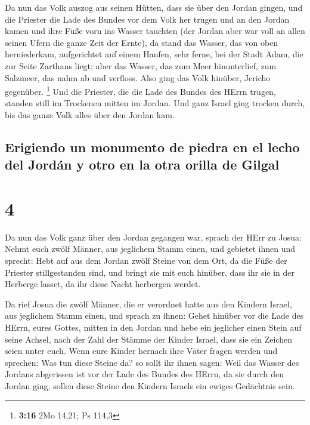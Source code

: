  Da nun das Volk auszog aus seinen Hütten, dass sie über
den Jordan gingen, und die Priester die Lade des Bundes vor dem Volk her
trugen  und an den Jordan kamen und ihre Füße vorn ins
Wasser tauchten (der Jordan aber war voll an allen seinen Ufern die
ganze Zeit der Ernte),  da stand das Wasser, das von oben
herniederkam, aufgerichtet auf einem Haufen, sehr ferne, bei der Stadt
Adam, die zur Seite Zarthans liegt; aber das Wasser, das zum Meer
hinunterlief, zum Salzmeer, das nahm ab und verfloss. Also ging das Volk
hinüber, Jericho gegenüber. \footnote{\textbf{3:16} 2Mo 14,21; Ps 114,3}
 Und die Priester, die die Lade des Bundes des HErrn
trugen, standen still im Trockenen mitten im Jordan. Und ganz Israel
ging trocken durch, bis das ganze Volk alles über den Jordan kam.

\hypertarget{erigiendo-un-monumento-de-piedra-en-el-lecho-del-jorduxe1n-y-otro-en-la-otra-orilla-de-gilgal}{%
\subsection{Erigiendo un monumento de piedra en el lecho del Jordán y
otro en la otra orilla de
Gilgal}\label{erigiendo-un-monumento-de-piedra-en-el-lecho-del-jorduxe1n-y-otro-en-la-otra-orilla-de-gilgal}}

\hypertarget{section-3}{%
\section{4}\label{section-3}}

 Da nun das Volk ganz über den Jordan gegangen war, sprach
der HErr zu Josua:  Nehmt euch zwölf Männer, aus jeglichem
Stamm einen,  und gebietet ihnen und sprecht: Hebt auf aus
dem Jordan zwölf Steine von dem Ort, da die Füße der Priester
stillgestanden sind, und bringt sie mit euch hinüber, dass ihr sie in
der Herberge lasset, da ihr diese Nacht herbergen werdet.

 Da rief Josua die zwölf Männer, die er verordnet hatte
aus den Kindern Israel, aus jeglichem Stamm einen,  und
sprach zu ihnen: Gehet hinüber vor die Lade des HErrn, eures Gottes,
mitten in den Jordan und hebe ein jeglicher einen Stein auf seine
Achsel, nach der Zahl der Stämme der Kinder Israel,  dass
sie ein Zeichen seien unter euch. Wenn eure Kinder hernach ihre Väter
fragen werden und sprechen: Was tun diese Steine da?  so
sollt ihr ihnen sagen: Weil das Wasser des Jordans abgerissen ist vor
der Lade des Bundes des HErrn, da sie durch den Jordan ging, sollen
diese Steine den Kindern Israels ein ewiges Gedächtnis sein.

